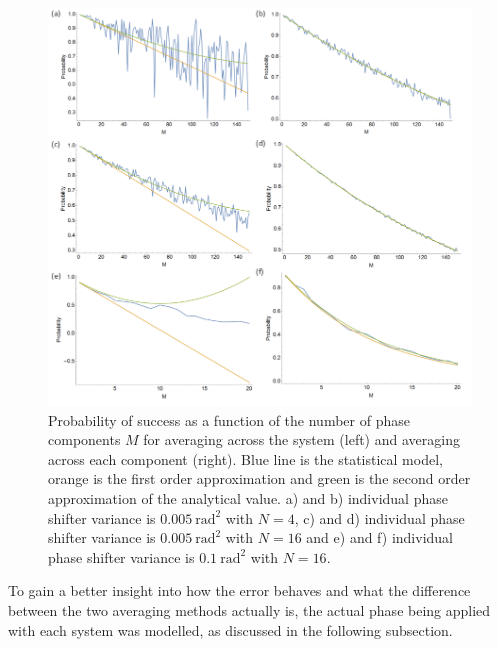 \documentclass[aps,pra,twocolumn,superscriptaddress,numerical]{revtex4-1}
\begin{document}
			\begin{center}
				\begin{figure}
					\begin{centering}
						\includegraphics[width=\columnwidth]{Psuccess_all.png}
						\par\end{centering}
					
					\caption[Comparison between the probability of success when averaging across the system and each component separately.]{Probability of success as a function of the number of phase components $M$ for averaging across the system (left) and averaging across each component (right). Blue line is the statistical model, orange is the first order approximation and green is the second order approximation of the analytical value. a) and b) individual phase shifter variance is $0.005\ \textrm{rad}^{2}$ with $N=4$, c) and d) individual phase shifter variance is $0.005\ \textrm{rad}^{2}$ with $N=16$ and e) and f) individual phase shifter variance is $0.1\ \textrm{rad}^{2}$ with $N=16$. \label{fig:Probability-of-success all}}
				\end{figure}
				
				\par\end{center}
			
			To gain a better insight into how the error behaves and what the difference between the two averaging methods actually is, the actual phase being applied with each system was modelled, as discussed in the following subsection.
			
\end{document}
